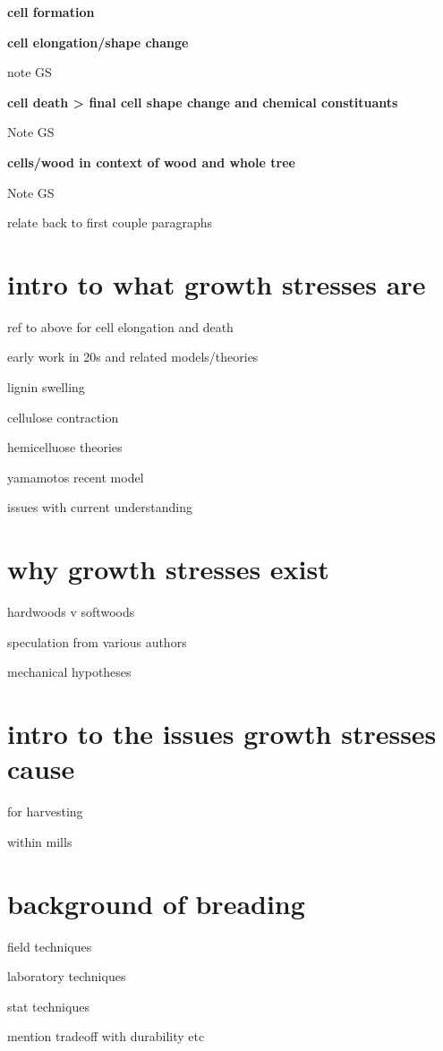 \documentclass{article}
\begin{document}
\textbf{cell formation}

\textbf{cell elongation/shape change}

note GS

\textbf{cell death > final cell shape change and chemical constituants}

Note GS

\textbf{cells/wood in context of wood and whole tree}

Note GS

relate back to first couple paragraphs


\section{intro to what growth stresses are}

ref to above for cell elongation and death

early work in 20s and related models/theories

lignin swelling

cellulose contraction

hemicelluose theories

yamamotos recent model

issues with current understanding


\section{why growth stresses exist}

hardwoods v softwoods

speculation from various authors

mechanical hypotheses

\section{intro to the issues growth stresses cause }

for harvesting

within mills

\section{background of breading}

field techniques

laboratory techniques

stat techniques

mention tradeoff with durability etc
\end{document}
